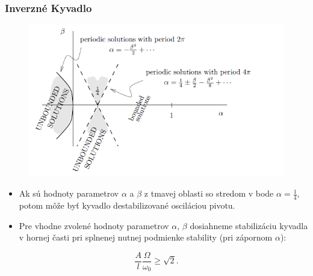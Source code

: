 \documentclass{beamer}
\begin{document}
\begin{frame}
\frametitle{Inverzné Kyvadlo}


\begin{figure}
\includegraphics[scale=0.45]{Boundary-graph.png}
\end{figure}

\begin{small}

\begin{itemize}
\item Ak sú hodnoty parametrov $\alpha$ a $\beta$ z tmavej oblasti so stredom v bode $\alpha=\frac{1}{4}$, potom môže byť kyvadlo destabilizované osciláciou pivotu.
\item Pre vhodne zvolené hodnoty parametrov $\alpha$, $\beta$ dosiahneme stabilizáciu kyvadla v hornej časti pri splnenej nutnej podmienke stability (pri zápornom $\alpha$):
\end{itemize}

\begin{equation*}
\frac{A}{l}\frac{\Omega}{\omega_0}\geq \sqrt{2}.
\end{equation*}  
\end{small}


 

\end{frame}
\end{document}
